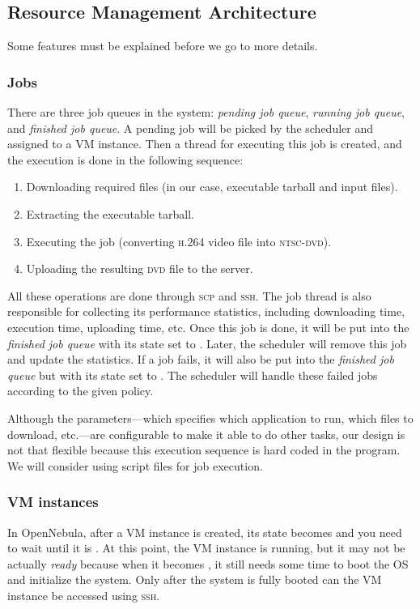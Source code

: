 \subsection{Resource Management Architecture}
Some features must be explained before we go to more details.

\subsubsection{Jobs}
There are three job queues in the system: \emph{pending job queue},
\emph{running job queue}, and \emph{finished job queue}. A pending job
will be picked by the scheduler and assigned to a VM instance. Then a
thread for executing this job is created, and the execution is done in
the following sequence:

\begin{enumerate}
\item Downloading required files (in our case, executable tarball and
  input files).
\item Extracting the executable tarball.
\item Executing the job (converting \textsc{h.264} video file into
  \textsc{ntsc-dvd}).
\item Uploading the resulting \textsc{dvd} file to the server.
\end{enumerate}

All these operations are done through \textsc{scp} and \textsc{ssh}.
The job thread is also responsible for collecting its performance
statistics, including downloading time, execution time, uploading
time, etc. Once this job is done, it will be put into the
\emph{finished job queue} with its state set to \statefinished. Later,
the scheduler will remove this job and update the statistics. If a job
fails, it will also be put into the \emph{finished job queue} but with
its state set to \statefailed.  The scheduler will handle these failed
jobs according to the given policy.

Although the parameters---which specifies which application to run, which
files to download, etc.---are configurable to make it able to do other
tasks, our design is not that flexible because this execution sequence
is hard coded in the program. We will consider using script files for job
execution.


\subsubsection{VM instances}
In OpenNebula, after a VM instance is created, its state becomes
\statepending and you need to wait until it is \staterunning.
At this point, the VM instance is running, but it may not be actually
\emph{ready} because when it becomes \staterunning, it still needs some
time to boot the OS and initialize the system. Only after the system is
fully booted can the VM instance be accessed using \textsc{ssh}.

